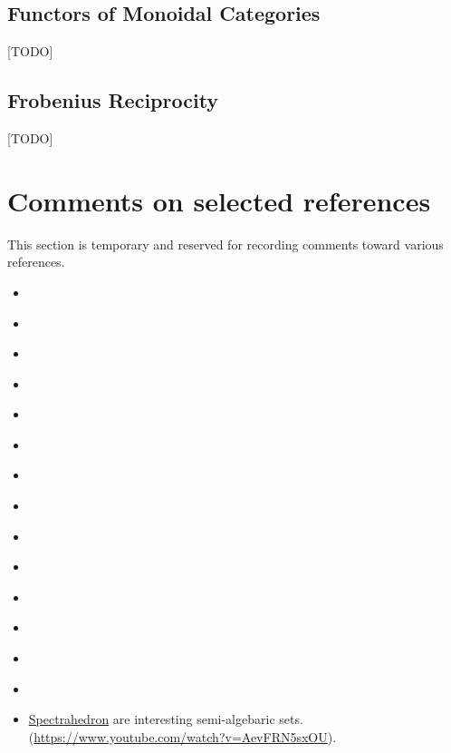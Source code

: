 \documentclass[10pt]{article}
\theoremstyle{definition}
\theoremstyle{remark}
\begin{document}
\subsection{Functors of Monoidal Categories}

\textcolor{red!50!black}{[TODO]}

\subsection{Frobenius Reciprocity}

\textcolor{red!50!black}{[TODO]}

\section*{Comments on selected references}
This section is temporary and reserved for recording comments toward various references.
\begin{itemize}
    \item \citeauthor{vistoli2004notes}~\cite{vistoli2004notes}
    \item \citeauthor{street1974fibrations}~\cite{street1974fibrations}
    \item \citeauthor{koudenburg2018categorical}~\cite{koudenburg2018categorical}
    \item \citeauthor{brown2009algebraic}~\cite{brown2009algebraic}
    \item \citeauthor{lurie2009higher}~\cite{lurie2009higher}
    \item \citeauthor{shulman2008framed}~\cite{shulman2008framed}
    \item \citeauthor{boyd2004convex}~\cite{boyd2004convex}
    \item \citeauthor{bogart2013hom}~\cite{bogart2013hom}
    \item \citeauthor{gubeladze2016affine}~\cite{gubeladze2016affine}
    \item \citeauthor{fausk2003isomorphisms}~\cite{fausk2003isomorphisms}
    \item \citeauthor{hofstra2011dialectica}~\cite{hofstra2011dialectica}
    \item \citeauthor{ponto2012duality}~\cite{ponto2012duality}
    \item \citeauthor{mac2013categories}~\cite{mac2013categories}
    \item \citeauthor{ziegler2012lectures}~\cite{ziegler2012lectures}
    \item \href{https://en.wikipedia.org/wiki/Spectrahedron}{Spectrahedron} are interesting semi-algebaric sets. (\url{https://www.youtube.com/watch?v=AevFRN5sxOU}).
\end{itemize}

\printbibliography
\end{document}
